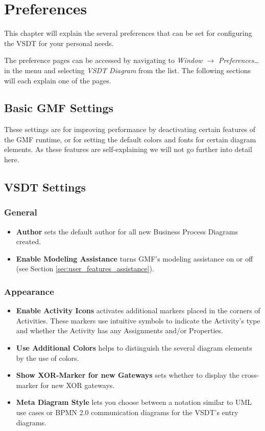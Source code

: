 \chapter{Preferences}
\label{sec:user_preferences}

This chapter will explain the several preferences that can be set for configuring the VSDT for your
personal needs.

The preference pages can be accessed by navigating to \emph{Window $\rightarrow$ Preferences\dots}
in the menu and selecting \emph{VSDT Diagram} from the list. The following sections will each
explain one of the pages.


\section{Basic GMF Settings}
\label{sec:user_preferences_gmf}

These settings are for improving performance by deactivating certain features of the GMF runtime, or
for setting the default colors and fonts for certain diagram elements. As these features are
self-explaining we will not go further into detail here.


\section{VSDT Settings}
\label{sec:user_preferences_vsdt}

\subsection{General}
\begin{itemize}
	\item \textbf{Author} sets the default author for all new Business Process Diagrams created.
	\item \textbf{Enable Modeling Assistance} turns GMF's modeling assistance on or off (see Section
	\ref{sec:user_features_assistance}).
\end{itemize}	

\subsection{Appearance}
\begin{itemize}
	\item \textbf{Enable Activity Icons} activates additional markers placed in the corners of
	Activities. These markers use intuitive symbols to indicate the Activity's type and whether the
	Activity has any Assignments and/or Properties.
	\item \textbf{Use Additional Colors} helps to distinguish the several diagram elements by the
	use of colors.
	\item \textbf{Show XOR-Marker for new Gateways} sets whether to display the cross-marker for new
	XOR gateways.
	\item \textbf{Meta Diagram Style} lets you choose between a notation similar to UML use cases or
	BPMN 2.0 communication diagrams for the VSDT's entry diagrams.
\end{itemize}

